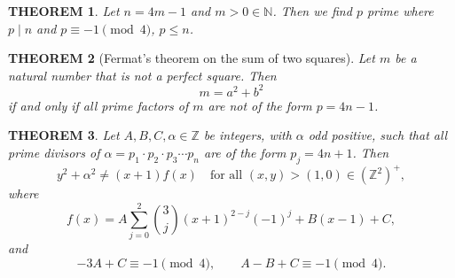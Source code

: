 \documentclass[10pt,a4paper]{amsart}
\newtheorem{theorem}{THEOREM}
\begin{document}
\begin{theorem}\label{thm1}
Let $n=4m-1$ and $m>0\in\mathbb{N}$. Then we find $p$ prime where $p\mid n$ and $p\equiv -1\pmod 4$, $p\le n$.
\end{theorem}

\begin{theorem}[Fermat's theorem on the sum of two squares]\label{thm2}
Let $m$ be a natural number that is not a perfect square. Then
\[
m = a^2+b^2
\]
if and only if all prime factors of $m$ are not of the form $p=4n-1$.
\end{theorem}

\begin{theorem}\label{thm3}
Let $A,B,C,\alpha\in\mathbb{Z}$ be integers, with $\alpha$ odd positive, such that all prime divisors of $\alpha = p_1\cdot p_2\cdot p_3\cdots p_n$ are of the form $p_j=4n+1$. Then
\[
y^2+\alpha^2 \ne (x+1)f(x) \quad \text{for all } (x,y) > (1,0) \in (\mathbb{Z}^2)^+,
\]
where
\[
f(x) = A\sum_{j=0}^2 \binom{3}{j}(x+1)^{2-j}(-1)^j + B(x-1)+C,
\]
and
\[
-3A+C\equiv -1\pmod 4, \qquad A-B+C\equiv -1\pmod 4.
\]
\end{theorem}
\end{document}
